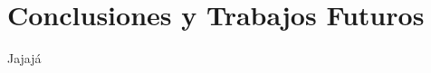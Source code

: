 \ifx\all\undefined


\fi

\chapter{Conclusiones y Trabajos Futuros}

Jajajá


\ifx\all\undefined

\fi